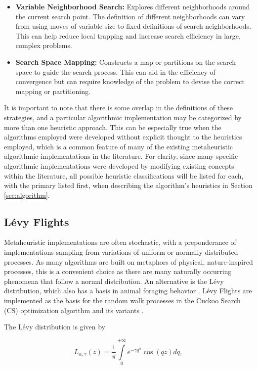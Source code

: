 \documentclass{article}                                                                           %
\begin{document}
\begin{itemize}
  \item \textbf{Variable Neighborhood Search:} Explores different neighborhoods around the current search point.  The definition of different neighborhoods can vary from using moves of variable size to fixed definitions of search neighborhoods.  This can help reduce local trapping and increase search efficiency in large, complex problems.              
  \item \textbf{Search Space Mapping:} Constructs a map or partitions on the search space to guide the search process.  This can aid in the efficiency of convergence but can require knowledge of the problem to devise the correct mapping or partitioning.  
\end{itemize}

It is important to note that there is some overlap in the definitions of these strategies, and a particular algorithmic implementation may be categorized by more than one heuristic approach.
This can be especially true when the algorithms employed were developed without explicit thought to the heuristics employed, which is a common feature of many of the existing metaheuristic algorithmic implementations in the literature.
For clarity, since many specific algorithmic implementations were developed by modifying existing concepts within the literature, all possible heuristic classifications will be listed for each, with the primary listed first, when describing the algorithm's heuristics in Section \ref{sec:algorithm}.

\subsection{Lévy Flights}
Metaheuristic implementations are often stochastic, with a preponderance of implementations sampling from variations of uniform or normally distributed processes.  
As many algorithms are built on metaphors of physical, nature-inspired processes, this is a convenient choice as there are many naturally occurring phenomena that follow a normal distribution.
An alternative is the Lévy distribution, which also has a basis in animal foraging behavior \cite{Levy1994, Zhao2015, Tran2004}.
Lévy Flights are implemented as the basis for the random walk processes in the Cuckoo Search (CS) optimization algorithm and its variants \cite{Yang2009}. 

The Lévy distribution is given by 

\begin{equation}
  L_{\alpha,\gamma}(z)=\frac{1}{\pi}\int \limits_{0}^{+\infty} e^{-\gamma q^{\alpha}} \cos(qz) dq,
\end{equation}
\end{document}
